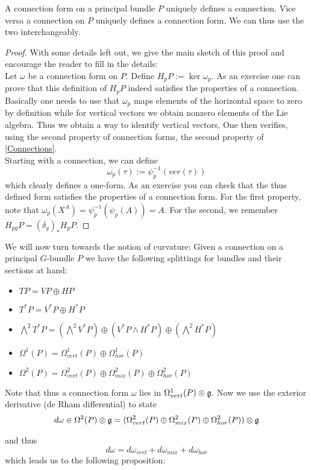 \begin{theo}
  A connection form on a principal bundle $P$ uniquely defines a connection. Vice versa a connection on $P$ uniquely defines a connection form. We can thus use the two interchangeably.
\begin{proof}
  With some details left out, we give the main sketch of this proof and encourage the reader to fill in the details:\\

  Let $\omega$ be a connection form on $P$. Define $H_pP:= \ker \omega_p$. As an exercise one can prove that this definition of $H_pP$ indeed satisfies the properties of a connection. Basically one needs to use that $\omega_p$ maps elements of the horizontal space to zero by definition while for vertical vectors we obtain nonzero elements of the Lie algebra. Thus we obtain a way to identify vertical vectors. One then verifies, using the second property of connection forms, the second property of \ref{Connections}.\\

  Starting with a connection, we can define
  $$ \omega_p(\tau) := \psi^{-1}_p (ver(\tau)) $$
  which clearly defines a one-form. As an exercise you can check that the thus defined form satisfies the properties of a connection form. For the first property, note that $\omega_p(X^A) = \psi^{-1}_p(\psi_p(A)) = A$. For the second, we remember $H_{pg}P = (\delta_g)_* H_pP$.
\end{proof}
\end{theo}

We will now turn towards the notion of curvature: Given a connection on a principal $G$-bundle $P$ we have the following splittings for bundles and their sections at hand:
\begin{itemize}
  \item $TP = VP \oplus HP$
  \item $T^*P = V^*P \oplus H^*P$
  \item $\bigwedge^2 T^*P = \left( \bigwedge^2 V^*P \right) \oplus \left( V^*P \wedge H^*P\right) \oplus \left( \bigwedge^2 H^*P \right)$
  \item $\Omega^1(P) = \Omega^1_{vert}(P) \oplus \Omega^1_{hor}(P)$
  \item $\Omega^2(P) = \Omega^2_{vert}(P) \oplus \Omega^2_{mix}(P) \oplus \Omega^2_{hor}(P)$
\end{itemize}
Note that thus a connection form $\omega$ lies in $\Omega^1_{vert}(P) \mathbin{\mathop{\otimes}\displaylimits_{}} \mathfrak{g}$. Now we use the exterior derivative (de Rham differential) to state
$$ d\omega \in \Omega^2(P) \mathbin{\mathop{\otimes}\displaylimits_{}} \mathfrak{g} = (\Omega^2_{vert}(P) \oplus \Omega^2_{mix}(P) \oplus \Omega^2_{hor}(P)) \mathbin{\mathop{\otimes}\displaylimits_{}} \mathfrak{g} $$
and thus
$$ d\omega = d\omega_{vert} + d\omega_{mix} + d\omega_{hor} $$
which leads us to the following proposition:

